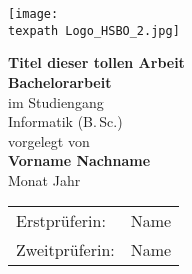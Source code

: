 \begin{titlepage}
	
	\begin{flushright}
		\begin{minipage}[b]{0.5\textwidth}
			\hfill\texttt{[image: \\texpath Logo\_HSBO\_2.jpg]}
		\end{minipage}
	\end{flushright}
	
	\vspace{4cm}
	
	\begin{minipage}[b]{\textwidth}
		\centering
		
		{\huge \textbf{Titel dieser tollen Arbeit}} \\[1.5cm] %
		
		{\large \textbf{Bachelorarbeit}} \\[0.15cm]
		im Studiengang \\
		Informatik (B.\,Sc.) \\[0.5cm] %
		
		vorgelegt von \\[0.15cm]
		{\large \textbf{Vorname Nachname}} \\[0.5cm] %
		
		Monat Jahr \\ %
	\end{minipage}
	
	\vfill
	
	\begin{minipage}[b]{\textwidth}
		\centering
		
		\begin{tabular}{ll}
			Erstprüferin: & Name \\
			Zweitprüferin: & Name
		\end{tabular} 
	\end{minipage}
		
\end{titlepage}